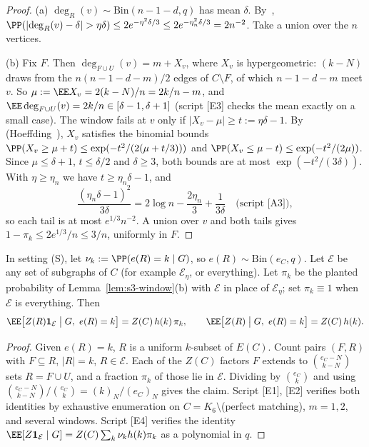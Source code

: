 \begin{proof}
(a) \(\deg_R(v)\sim\mathrm{Bin}(n-1-d,q)\) has mean \(\delta\).
By~\cite[Corollary~2.3]{JLR00},
\(\PP(\lvert\deg_R(v)-\delta\rvert>\eta\delta)\le2e^{-\eta^2\delta/3}\le2e^{-\eta_n^2\delta/3}=2n^{-2}\).
Take a union over the \(n\) vertices.

(b) Fix \(F\). Then \(\deg_{F\cup U}(v)=m+X_v\), where \(X_v\) is hypergeometric:
\((k-N)\) draws from the \(n(n-1-d-m)/2\) edges of \(C\setminus F\), of which
\(n-1-d-m\) meet \(v\). So \(\mu:=\EE X_v=2(k-N)/n=2k/n-m\), and
\(\EE\deg_{F\cup U}(v)=2k/n\in[\delta-1,\delta+1]\) (script [E3] checks the mean
exactly on a small case). The window fails at \(v\) only if
\(\lvert X_v-\mu\rvert\ge t:=\eta\delta-1\). By~\cite[Theorem~2.10]{JLR00}
(Hoeffding~\cite{Hoeffding63}), \(X_v\) satisfies the binomial bounds
\(\PP(X_v\ge\mu+t)\le\exp(-t^2/(2(\mu+t/3)))\) and
\(\PP(X_v\le\mu-t)\le\exp(-t^2/(2\mu))\). Since \(\mu\le\delta+1\),
\(t\le\delta/2\) and \(\delta\ge3\), both bounds are at most \(\exp(-t^2/(3\delta))\). With
\(\eta\ge\eta_n\) we have \(t\ge\eta_n\delta-1\), and
\[
\frac{(\eta_n\delta-1)^2}{3\delta}=2\log n-\frac{2\eta_n}{3}+\frac1{3\delta}
\quad\text{(script [A3])},
\]
so each tail is at most \(e^{1/3}n^{-2}\). A union over \(v\) and both tails gives
\(1-\pi_k\le2e^{1/3}/n\le3/n\), uniformly in \(F\).
\end{proof}

\begin{lemma}
\label{lem:s3-edge-count}
In setting (S), let \(\nu_k:=\PP(e(R)=k\mid G)\), so \(e(R)\sim\mathrm{Bin}(e_C,q)\).
Let \(\mathcal E\) be any set of subgraphs of \(C\) (for example \(\mathcal E_\eta\), or everything).
Let \(\pi_k\) be the planted probability of Lemma~\ref{lem:s3-window}(b) with
\(\mathcal E\) in place of \(\mathcal E_\eta\); set \(\pi_k\equiv1\) when \(\mathcal E\) is everything. Then
\[
\EE\bigl[Z(R)\mathbf 1_{\mathcal E}\bigm|G,\ e(R)=k\bigr]=Z(C)\,h(k)\,\pi_k ,
\qquad
\EE\bigl[Z(R)\bigm|G,\ e(R)=k\bigr]=Z(C)\,h(k).
\]
\end{lemma}

\begin{proof}
Given \(e(R)=k\), \(R\) is a uniform \(k\)-subset of \(E(C)\). Count pairs \((F,R)\)
with \(F\subseteq R\), \(\lvert R\rvert=k\), \(R\in\mathcal E\). Each of the \(Z(C)\)
factors \(F\) extends to \(\binom{e_C-N}{k-N}\) sets \(R=F\cup U\), and a fraction
\(\pi_k\) of those lie in \(\mathcal E\). Dividing by \(\binom{e_C}{k}\) and using
\(\binom{e_C-N}{k-N}/\binom{e_C}{k}=(k)_N/(e_C)_N\) gives the claim. Script [E1], [E2] verifies both identities by
exhaustive enumeration on \(C=K_6\setminus\)(perfect matching), \(m=1,2\), and several
windows. Script [E4] verifies the identity
\(\EE[Z\mathbf 1_{\mathcal E}\mid G]=Z(C)\sum_k\nu_kh(k)\pi_k\) as a polynomial in \(q\).
\end{proof}

